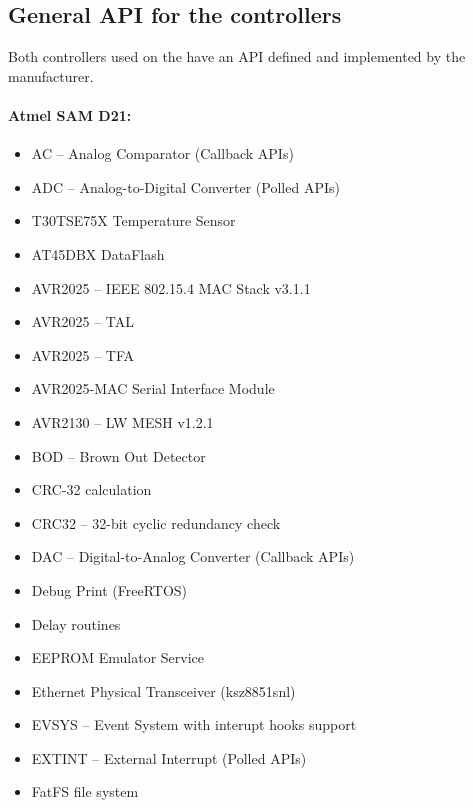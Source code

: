 \subsection{General \ac{API} for the controllers}
\label{GeneralAPI}
Both controllers used on the  have an \ac{API} defined and implemented by the manufacturer.

\newpage
\paragraph{Atmel SAM D21:} \cite{AtmelSAMd20API}
\begin{multicols}{2}
    \begin{flushleft}
        \begin{itemize}
            \setlength\itemsep{1pt}
            \item AC -- Analog Comparator (Callback \ac{API}s)
            \item ADC -- Analog-to-Digital Converter (Polled \ac{API}s)
            \item T30TSE75X Temperature Sensor
            \item AT45DBX DataFlash
            \item AVR2025 -- IEEE 802.15.4 MAC Stack v3.1.1
            \item AVR2025 -- TAL
            \item AVR2025 -- TFA
            \item AVR2025-MAC Serial Interface Module
            \item AVR2130 -- LW MESH v1.2.1
            \item BOD -- Brown Out Detector
            \item CRC-32 calculation
            \item CRC32 -- 32-bit cyclic redundancy check
            \item DAC -- Digital-to-Analog Converter (Callback \ac{API}s)
            \item Debug Print (FreeRTOS)
            \item Delay routines
            \item EEPROM Emulator Service
            \item Ethernet Physical Transceiver (ksz8851snl)
            \item EVSYS -- Event System with interupt hooks support
            \item EXTINT -- External Interrupt (Polled \ac{API}s)
            \item FatFS file system

\end{itemize}
\end{flushleft}
\end{multicols}
